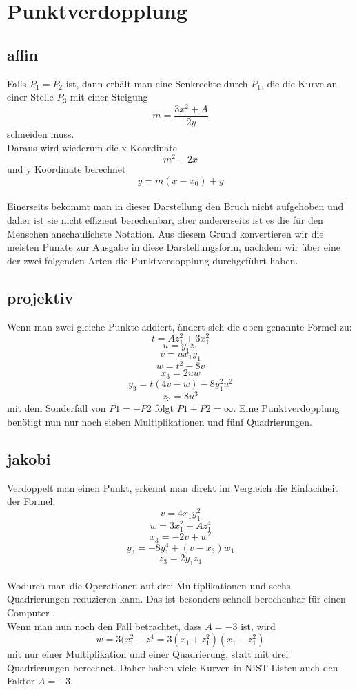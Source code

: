 \section{Punktverdopplung}
\subsection{affin}
Falls \(P_1 = P_2\) ist, dann erhält man eine Senkrechte durch \(P_1\), die die Kurve an einer Stelle \(P_3\) mit einer Steigung \[m = \frac{3x^2+A}{2y}\] schneiden muss.\\
Daraus wird wiederum die x Koordinate \[m^2-2x\] und y Koordinate berechnet \[y = m(x - x_0)+y\]\\ Einerseits bekommt man in dieser Darstellung den Bruch nicht aufgehoben und daher ist sie nicht effizient berechenbar, aber andererseits ist es die für den Menschen anschaulichste Notation. Aus diesem Grund konvertieren wir die meisten Punkte zur Ausgabe in diese Darstellungsform, nachdem wir über eine der zwei folgenden Arten die Punktverdopplung durchgeführt haben.
\subsection{projektiv}
Wenn man zwei gleiche Punkte addiert, ändert sich die oben genannte Formel zu:
\[t = Az_1^2 + 3x_1^2\] \[u = y_1z_1\] \[v = ux_1y_1\] \[w = t^2 - 8v\] \[x_3 = 2uw\] \[y_3 = t(4v-w)- 8y_1^2u^2\] \[z_3 = 8u^3\] mit dem Sonderfall von \(P1 = -P2\) folgt \(P1 + P2 = \infty\). Eine Punktverdopplung benötigt nun nur noch sieben Multiplikationen und fünf Quadrierungen.
\subsection{jakobi}
Verdoppelt man einen Punkt, erkennt man direkt im Vergleich die Einfachheit der Formel:
\[v = 4x_1y_1^2\] \[w = 3x_1^2 + Az_1^4\] \[x_3 = -2v + w^2\] \[y_3 = -8y_1^4 + (v-x_3)w_1\] \[z_3 = 2y_1z_1\]\\ 
Wodurch man die Operationen auf drei Multiplikationen und sechs Quadrierungen reduzieren kann. Das ist besonders schnell berechenbar für einen Computer \cite{Washington2003}.\\
Wenn man nun noch den Fall betrachtet, dass \(A = -3\) ist, wird \[w = 3(x_1^2 - z_1^4 = 3(x_1 + z_1^2)(x_1 - z_1^2)\] mit nur einer Multiplikation und einer Quadrierung, statt mit drei Quadrierungen berechnet. Daher haben viele Kurven in NIST Listen auch den Faktor \(A = -3\).